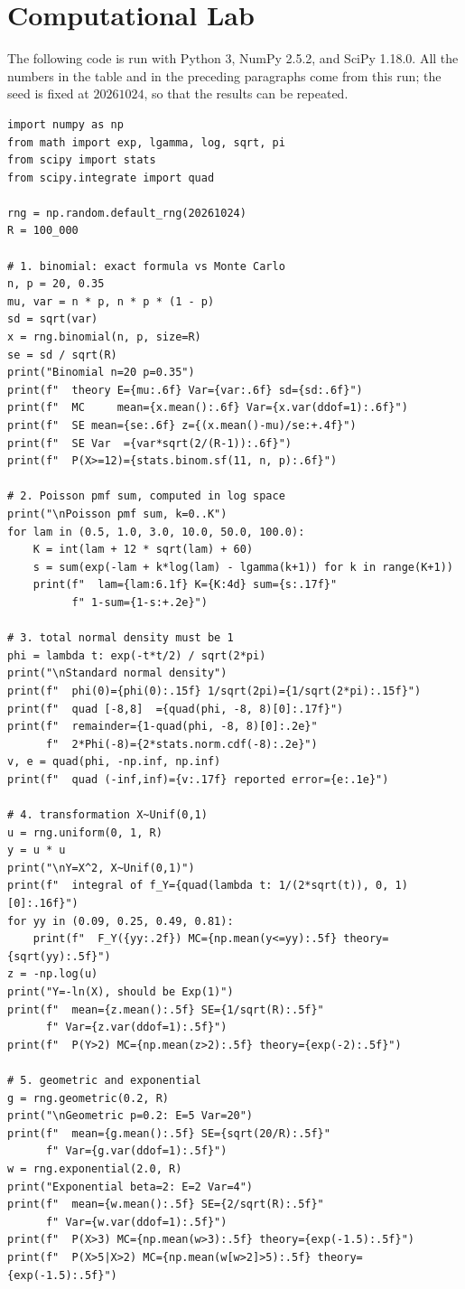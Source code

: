 \section{Computational Lab}

The following code is run with Python 3, NumPy 2.5.2, and SciPy 1.18.0. All the numbers
in the table and in the preceding paragraphs come from this run; the seed is fixed at
$20261024$, so that the results can be repeated.

\begin{lab}
\begin{verbatim}
import numpy as np
from math import exp, lgamma, log, sqrt, pi
from scipy import stats
from scipy.integrate import quad

rng = np.random.default_rng(20261024)
R = 100_000

# 1. binomial: exact formula vs Monte Carlo
n, p = 20, 0.35
mu, var = n * p, n * p * (1 - p)
sd = sqrt(var)
x = rng.binomial(n, p, size=R)
se = sd / sqrt(R)
print("Binomial n=20 p=0.35")
print(f"  theory E={mu:.6f} Var={var:.6f} sd={sd:.6f}")
print(f"  MC     mean={x.mean():.6f} Var={x.var(ddof=1):.6f}")
print(f"  SE mean={se:.6f} z={(x.mean()-mu)/se:+.4f}")
print(f"  SE Var  ={var*sqrt(2/(R-1)):.6f}")
print(f"  P(X>=12)={stats.binom.sf(11, n, p):.6f}")

# 2. Poisson pmf sum, computed in log space
print("\nPoisson pmf sum, k=0..K")
for lam in (0.5, 1.0, 3.0, 10.0, 50.0, 100.0):
    K = int(lam + 12 * sqrt(lam) + 60)
    s = sum(exp(-lam + k*log(lam) - lgamma(k+1)) for k in range(K+1))
    print(f"  lam={lam:6.1f} K={K:4d} sum={s:.17f}"
          f" 1-sum={1-s:+.2e}")

# 3. total normal density must be 1
phi = lambda t: exp(-t*t/2) / sqrt(2*pi)
print("\nStandard normal density")
print(f"  phi(0)={phi(0):.15f} 1/sqrt(2pi)={1/sqrt(2*pi):.15f}")
print(f"  quad [-8,8]  ={quad(phi, -8, 8)[0]:.17f}")
print(f"  remainder={1-quad(phi, -8, 8)[0]:.2e}"
      f"  2*Phi(-8)={2*stats.norm.cdf(-8):.2e}")
v, e = quad(phi, -np.inf, np.inf)
print(f"  quad (-inf,inf)={v:.17f} reported error={e:.1e}")

# 4. transformation X~Unif(0,1)
u = rng.uniform(0, 1, R)
y = u * u
print("\nY=X^2, X~Unif(0,1)")
print(f"  integral of f_Y={quad(lambda t: 1/(2*sqrt(t)), 0, 1)[0]:.16f}")
for yy in (0.09, 0.25, 0.49, 0.81):
    print(f"  F_Y({yy:.2f}) MC={np.mean(y<=yy):.5f} theory={sqrt(yy):.5f}")
z = -np.log(u)
print("Y=-ln(X), should be Exp(1)")
print(f"  mean={z.mean():.5f} SE={1/sqrt(R):.5f}"
      f" Var={z.var(ddof=1):.5f}")
print(f"  P(Y>2) MC={np.mean(z>2):.5f} theory={exp(-2):.5f}")

# 5. geometric and exponential
g = rng.geometric(0.2, R)
print("\nGeometric p=0.2: E=5 Var=20")
print(f"  mean={g.mean():.5f} SE={sqrt(20/R):.5f}"
      f" Var={g.var(ddof=1):.5f}")
w = rng.exponential(2.0, R)
print("Exponential beta=2: E=2 Var=4")
print(f"  mean={w.mean():.5f} SE={2/sqrt(R):.5f}"
      f" Var={w.var(ddof=1):.5f}")
print(f"  P(X>3) MC={np.mean(w>3):.5f} theory={exp(-1.5):.5f}")
print(f"  P(X>5|X>2) MC={np.mean(w[w>2]>5):.5f} theory={exp(-1.5):.5f}")
\end{verbatim}
\end{lab}

